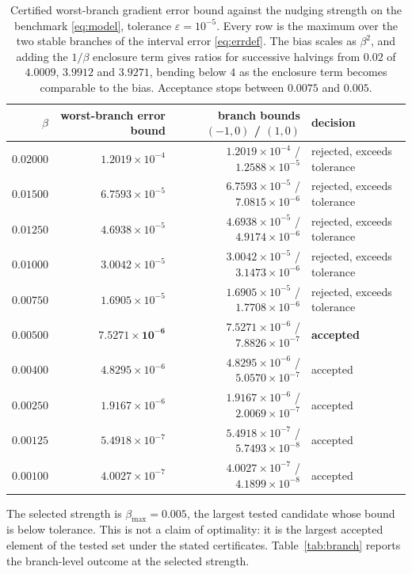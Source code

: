 \documentclass[11pt]{article}
\theoremstyle{definition}
\theoremstyle{remark}
\newcommand{\betamax}{\beta_{\max}}
\begin{document}
\begin{table}[t]
\centering
\small
\caption{Certified worst-branch gradient error bound against the nudging strength on the
benchmark \eqref{eq:model}, tolerance $\varepsilon = 10^{-5}$. Every row is the maximum over the
two stable branches of the interval error \eqref{eq:errdef}. The bias scales as $\beta^2$, and adding the
$1/\beta$ enclosure term gives ratios for successive halvings from $0.02$ of $4.0009$, $3.9912$ and
$3.9271$, bending below $4$ as the enclosure term becomes comparable to the bias. Acceptance stops between
$0.0075$ and $0.005$.}
\label{tab:scan}
\begin{tabular}{rrrl}
\toprule
$\beta$ & worst-branch error bound & branch bounds $(-1,0)$ / $(1,0)$ & decision \\
\midrule
$0.02000$ & $1.2019\times10^{-4}$ & $1.2019\times10^{-4}$ / $1.2588\times10^{-5}$ & rejected, exceeds tolerance \\
$0.01500$ & $6.7593\times10^{-5}$ & $6.7593\times10^{-5}$ / $7.0815\times10^{-6}$ & rejected, exceeds tolerance \\
$0.01250$ & $4.6938\times10^{-5}$ & $4.6938\times10^{-5}$ / $4.9174\times10^{-6}$ & rejected, exceeds tolerance \\
$0.01000$ & $3.0042\times10^{-5}$ & $3.0042\times10^{-5}$ / $3.1473\times10^{-6}$ & rejected, exceeds tolerance \\
$0.00750$ & $1.6905\times10^{-5}$ & $1.6905\times10^{-5}$ / $1.7708\times10^{-6}$ & rejected, exceeds tolerance \\
$\mathbf{0.00500}$ & $\mathbf{7.5271\times10^{-6}}$ & $7.5271\times10^{-6}$ / $7.8826\times10^{-7}$ & \textbf{accepted} \\
$0.00400$ & $4.8295\times10^{-6}$ & $4.8295\times10^{-6}$ / $5.0570\times10^{-7}$ & accepted \\
$0.00250$ & $1.9167\times10^{-6}$ & $1.9167\times10^{-6}$ / $2.0069\times10^{-7}$ & accepted \\
$0.00125$ & $5.4918\times10^{-7}$ & $5.4918\times10^{-7}$ / $5.7493\times10^{-8}$ & accepted \\
$0.00100$ & $4.0027\times10^{-7}$ & $4.0027\times10^{-7}$ / $4.1899\times10^{-8}$ & accepted \\
\bottomrule
\end{tabular}
\end{table}

The selected strength is $\betamax = 0.005$, the largest tested candidate whose bound is below
tolerance. This is not a claim of optimality: it is the largest accepted element of the tested
set under the stated certificates. Table~\ref{tab:branch} reports the branch-level outcome at the
selected strength.
\end{document}
